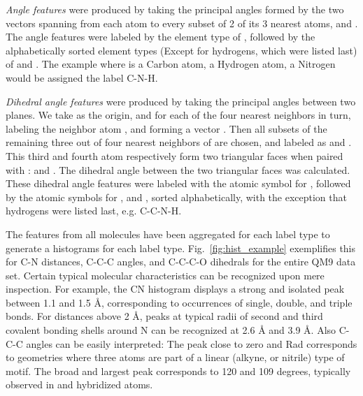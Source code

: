 \documentclass[reprint, superscriptaddress,
amsmath,amssymb, aps, prb,
]{revtex4-1}
\begin{document}
{\emph{Angle features} were produced by taking the principal angles formed by the two vectors spanning from each atom  to every subset of 2 of its 3 nearest atoms,  and .
The angle features were labeled by the element type of , followed by the alphabetically sorted element types (Except for hydrogens, which were listed last) of  and .
The example where  is a Carbon atom,  a Hydrogen atom,  a Nitrogen would be assigned the label C-N-H.

\emph{Dihedral angle features} 
were produced by taking the principal angles between two planes. We take  as the origin, and for each of the four nearest neighbors in turn, labeling the neighbor atom , and forming a vector . 
Then all  subsets of the remaining three out of four nearest neighbors of  are chosen, and labeled as  and . 
This third and fourth atom respectively form two triangular faces when paired with :  and . 
The dihedral angle between the two triangular faces was calculated.
These dihedral angle features were labeled with the atomic symbol for , followed by the atomic symbols for ,  and , sorted alphabetically, with the exception that hydrogens were listed last, e.g. C-C-N-H.









The features from all molecules have been aggregated for each label type to generate a histograms for each label type. 
Fig.~\ref{fig:hist_example} exemplifies this for C-N distances, C-C-C angles, and C-C-C-O dihedrals for the entire QM9 data set. 
Certain typical molecular characteristics can be recognized upon mere inspection. 
For example, the CN histogram displays a strong and isolated peak between 1.1 and 1.5 {\AA}, corresponding to occurrences of single, double, and triple bonds. 
For distances above 2 {\AA}, peaks at typical radii of second and third covalent bonding shells around N can be recognized at 2.6 {\AA} and 3.9 {\AA}. 
Also C-C-C angles can be easily interpreted: The peak close to zero and  Rad corresponds to geometries where three atoms are part of a linear (alkyne, or nitrile) type of motif. 
The broad and largest peak corresponds to 120 and 109 degrees, typically observed in  and  hybridized atoms. 

}
\end{document}
